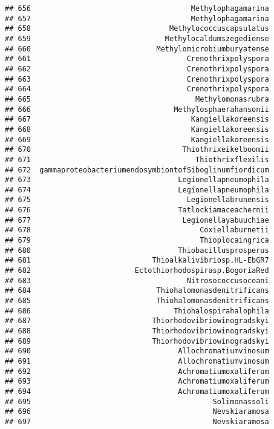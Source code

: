 \documentclass[
]{article}
\begin{document}
\begin{verbatim}
## 656                                     Methylophagamarina
## 657                                     Methylophagamarina
## 658                                Methylococcuscapsulatus
## 659                               Methylocaldumszegediense
## 660                             Methylomicrobiumburyatense
## 661                                    Crenothrixpolyspora
## 662                                    Crenothrixpolyspora
## 663                                    Crenothrixpolyspora
## 664                                    Crenothrixpolyspora
## 665                                      Methylomonasrubra
## 666                                 Methylosphaerahansonii
## 667                                     Kangiellakoreensis
## 668                                     Kangiellakoreensis
## 669                                     Kangiellakoreensis
## 670                                   Thiothrixeikelboomii
## 671                                      Thiothrixflexilis
## 672  gammaproteobacteriumendosymbiontofSiboglinumfiordicum
## 673                                  Legionellapneumophila
## 674                                  Legionellapneumophila
## 675                                    Legionellabrunensis
## 676                                  Tatlockiamaceachernii
## 677                                   Legionellayabuuchiae
## 678                                       Coxiellaburnetii
## 679                                       Thioplocaingrica
## 680                                  Thiobacillusprosperus
## 681                            Thioalkalivibriosp.HL-EbGR7
## 682                        Ectothiorhodospirasp.BogoriaRed
## 683                                    Nitrosococcusoceani
## 684                             Thiohalomonasdenitrificans
## 685                             Thiohalomonasdenitrificans
## 686                                 Thiohalospirahalophila
## 687                            Thiorhodovibriowinogradskyi
## 688                            Thiorhodovibriowinogradskyi
## 689                            Thiorhodovibriowinogradskyi
## 690                                  Allochromatiumvinosum
## 691                                  Allochromatiumvinosum
## 692                                  Achromatiumoxaliferum
## 693                                  Achromatiumoxaliferum
## 694                                  Achromatiumoxaliferum
## 695                                          Solimonassoli
## 696                                          Nevskiaramosa
## 697                                          Nevskiaramosa

\end{verbatim}
\end{document}
